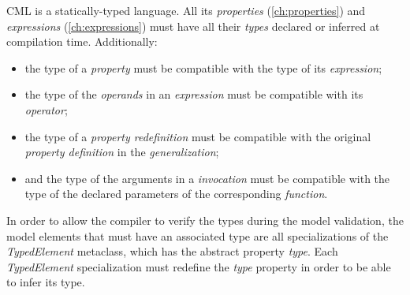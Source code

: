 CML is a statically-typed language.
All its \emph{properties} (\ref{ch:properties})
and \emph{expressions} (\ref{ch:expressions}) must have all their \emph{types} declared or inferred at compilation time.
Additionally:

\begin{itemize}
\item the type of a \emph{property} must be compatible with the type of its \emph{expression};
\item the type of the \emph{operands} in an \emph{expression} must be compatible with its \emph{operator};
\item the type of a \emph{property redefinition} must be compatible with
the original \emph{property definition} in the \emph{generalization};
\item and the type of the arguments in a \emph{invocation} must be compatible with the
type of the declared parameters of the corresponding \emph{function}.
\end{itemize}

In order to allow the compiler to verify the types during the model validation,
the model elements that must have an associated type
are all specializations of the \emph{TypedElement} metaclass,
which has the abstract property \emph{type}.
Each \emph{TypedElement} specialization must redefine the \emph{type} property
in order to be able to infer its type.
